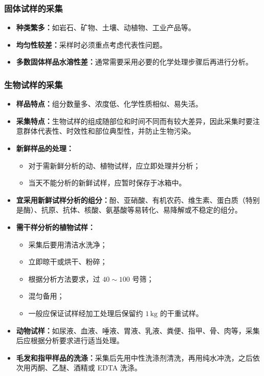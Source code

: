 \documentclass[12pt,a4paper]{article}
\numberwithin{equation}{section}
\begin{document}
\subsubsection*{固体试样的采集}
\begin{itemize}
    \item \textbf{种类繁多：}如岩石、矿物、土壤、动植物、工业产品等。
    
    \item \textbf{均匀性较差：}采样时必须重点考虑代表性问题。
    
    \item \textbf{多数固体样品水溶性差：}通常需要采用必要的化学处理步骤后再进行分析。
\end{itemize}
\subsubsection*{生物试样的采集}
\begin{itemize}
    \item \textbf{样品特点：}组分数量多、浓度低、化学性质相似、易失活。
    
    \item \textbf{采集特点：}生物试样的组成随部位和时间不同而有较大差异，因此采集时要注意群体代表性、时效性和部位典型性，并防止生物污染。
    
    \item \textbf{新鲜样品的处理：}
    \begin{itemize}
        \item 对于需新鲜分析的动、植物试样，应立即处理并分析；
        \item 当天不能分析的新鲜试样，应暂时保存于冰箱中。
    \end{itemize}
    
    \item \textbf{宜采用新鲜试样分析的组分：}酚、亚硝酸、有机农药、维生素、蛋白质（特别是酶）、抗原、抗体、核酸、氨基酸等易转化、易降解或不稳定的组分。
    
    \item \textbf{需干样分析的植物试样：}
    \begin{itemize}
        \item 采集后要用清洁水洗净；
        \item 立即晾干或烘干、粉碎；
        \item 根据分析方法要求，过 $40\sim100$ 号筛；
        \item 混匀备用；
        \item 一般应保证试样经加工处理后保留约 $1\,\mathrm{kg}$ 的干重试样。
    \end{itemize}
    
    \item \textbf{动物试样：}如尿液、血液、唾液、胃液、乳液、粪便、指甲、骨、肉等，采集后应根据分析要求进行适当处理。
    
    \item \textbf{毛发和指甲样品的洗涤：}采集后先用中性洗涤剂清洗，再用纯水冲洗，之后依次用丙酮、乙醚、酒精或 EDTA 洗涤。
\end{itemize}
\end{document}
